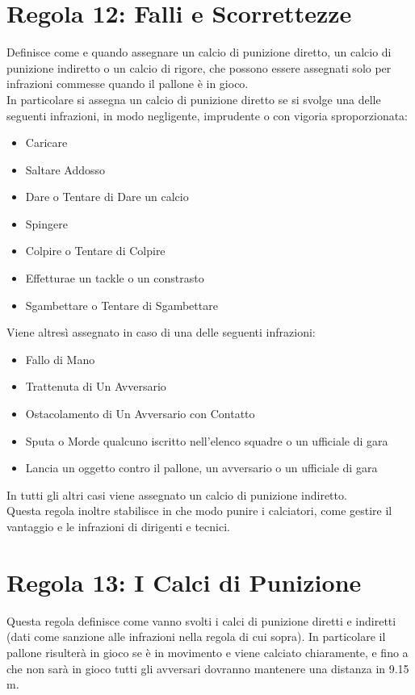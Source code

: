 \documentclass[../uefaC.tex]{subfiles}
\begin{document}
\section{Regola 12: Falli e Scorrettezze}
Definisce come e quando assegnare un calcio di punizione diretto, un calcio di punizione indiretto o un calcio di rigore, che possono essere assegnati solo per infrazioni commesse quando il pallone è in gioco. \hfill \\
In particolare si assegna un calcio di punizione diretto se si svolge una delle seguenti infrazioni, in modo negligente, imprudente o con vigoria sproporzionata:
\begin{itemize}
    \item Caricare
    \item Saltare Addosso
    \item Dare o Tentare di Dare un calcio 
    \item Spingere 
    \item Colpire o Tentare di Colpire 
    \item Effetturae un tackle o un constrasto
    \item Sgambettare o Tentare di Sgambettare
\end{itemize}
Viene altresì assegnato in caso di una delle seguenti infrazioni:
\begin{itemize}
    \item Fallo di Mano
    \item Trattenuta di Un Avversario
    \item Ostacolamento di Un Avversario con Contatto
    \item Sputa o Morde qualcuno iscritto nell'elenco squadre o un ufficiale di gara 
    \item Lancia un oggetto contro il pallone, un avversario o un ufficiale di gara 
\end{itemize}
In tutti gli altri casi viene assegnato un calcio di punizione indiretto.\hfill \\
Questa regola inoltre stabilisce in che modo punire i calciatori, come gestire il vantaggio e le infrazioni di dirigenti e tecnici.

\section{Regola 13: I Calci di Punizione}
Questa regola definisce come vanno svolti i calci di punizione diretti e indiretti (dati come sanzione alle infrazioni nella regola di cui sopra). In particolare il pallone risulterà in gioco se è in movimento e viene calciato chiaramente, e fino a che non sarà in gioco tutti gli avversari dovranno mantenere una distanza in 9.15 m.
\end{document}
